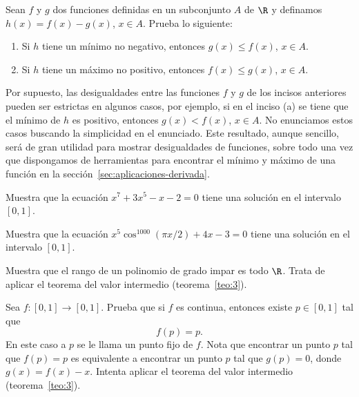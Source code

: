 \documentclass[12pt,a4paper]{book}
\begin{document}
    \begin{ejercicio}\label{ej:207}
        Sean $f$ y $g$ dos funciones
        definidas en un subconjunto $A$ de $\R$ y definamos $h(x)=f(x)-g(x)$, $x\in A$.
        Prueba lo siguiente:
        \begin{enumerate}[nosep]
            \item Si $h$ tiene un mínimo no negativo, entonces $g(x)\leq f(x)$, $x\in A$.
            \item Si $h$ tiene un máximo no positivo, entonces $f(x)\leq g(x)$, $x\in A$.
        \end{enumerate}
        Por supuesto, las desigualdades entre las funciones $f$ y $g$ de los incisos anteriores
        pueden ser estrictas en algunos casos, por ejemplo, si en el inciso (a) se
        tiene que el mínimo de $h$ es positivo, entonces $g(x)<f(x)$, $x\in A$. No enunciamos
        estos casos buscando la simplicidad en el enunciado. Este resultado,
        aunque sencillo, será de gran utilidad para mostrar desigualdades de funciones,
        sobre todo una vez que dispongamos de herramientas para encontrar el
        mínimo y máximo de una función en la sección~\ref{sec:aplicaciones-derivada}.
    \end{ejercicio}

    \begin{ejercicio}\label{ej:208}
        Muestra que la ecuación $x^{7}+3x^{5}-x-2=0$ tiene una
        solución en el intervalo $[0,1]$.
    \end{ejercicio}

    \begin{ejercicio}\label{ej:209}
        Muestra que la ecuación $x^{5}\cos^{1000}(\pi x/2)+4x-3=0$ tiene
        una solución en el intervalo $[0,1]$.
    \end{ejercicio}

    \begin{ejercicio}\label{ej:210}
        Muestra que el rango de un polinomio de grado impar es todo
        $\R$. \sugerencia Trata de aplicar el teorema del valor intermedio (teorema~\ref{teo:3}).
    \end{ejercicio}

    \begin{ejercicio}\label{ej:211}
        Sea $f:[0,1]\to[0,1]$. Prueba que si $f$ es continua, entonces
        existe $p\in[0,1]$ tal que
        \begin{equation*}
            f(p)=p.
        \end{equation*}
        En este caso a $p$ se le llama un punto fijo de $f$. \sugerencia Nota que
        encontrar un punto $p$ tal que $f(p)=p$ es equivalente a encontrar un punto
        $p$ tal que $g(p)=0$, donde $g(x)=f(x)-x$. Intenta aplicar el teorema del
        valor intermedio (teorema~\ref{teo:3}).
    \end{ejercicio}
\end{document}
